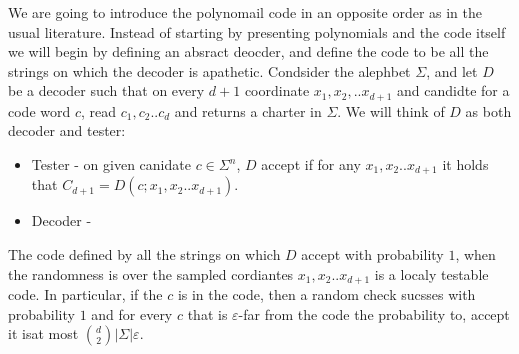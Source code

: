 

We are going to introduce the polynomail code in an opposite order as in the usual literature. Instead of starting by presenting polynomials and the code itself we will begin by defining an absract deocder, and define the code to be all the strings on which the decoder is apathetic. Condsider the alephbet $\Sigma$, and let $D$ be a decoder such that on every $d+1$ coordinate $x_1,x_2, .. x_{d+1}$ and candidte for a code word $c$, read $c_1, c_2 .. c_{d}$ and returns   a charter in $\Sigma$. We will think of $D$ as both decoder and tester: 
\begin{itemize}
  \item Tester  - on given canidate $c \in \Sigma^{n}$, $D$ accept if for any $x_1,x_2.. x_{d+1}$ it holds that $C_{d+1} = D\left(c; x_1, x_2 .. x_{d+1} \right)$. 
  \item Decoder - 
\end{itemize}

\begin{claim}The code defined by all the strings on which $D$ accept with probability $1$, when the randomness is over the sampled cordiantes $x_{1}, x_{2} .. x_{d+1}$ is a localy testable code. In particular, if the $c$ is in the code, then a random check sucsses with probability $1$ and for every $c$ that is $\varepsilon$-far from the code the probability to, accept it isat most $ { d \choose 2 } |\Sigma| \varepsilon $.  
\end{claim}

